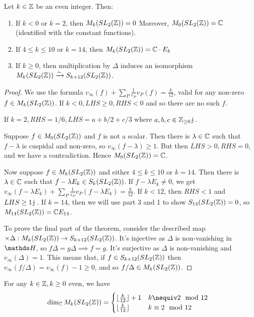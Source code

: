 \documentclass[10pt,a4paper]{article}
\begin{document}
\begin{theorem}
  Let $k \in \mathbb{Z}$ be an even integer. Then:
  \begin{enumerate}
    \item If $k<0$ or $k=2$, then $M_k(SL_2(\mathbb{Z})) = 0$ Moreover, $M_0(SL_2(\mathbb{Z})) = \mathbb{C}$ (identified with the constant functions).
    \item If $4 \leq k \leq 10$ or $k=14$, then $M_k(SL_2(\mathbb{Z})) = \mathbb{C}\cdot E_k$
    \item If $k \geq 0$, then multiplication by $\Delta$ induces an isomorphism $M_k(SL_2(\mathbb{Z})) \xrightarrow{\sim} S_{k+12}(SL_2(\mathbb{Z}))$.
  \end{enumerate}
\end{theorem}
\begin{proof}
  We use the formula $v_\infty(f)+\sum_P \frac{1}{e_P}v_P(f) = \frac{k}{12}$, valid for any non-zero $f \in M_k(SL_2(\mathbb{Z}))$. If $k<0, LHS \geq 0, RHS < 0$ and so there are no such $f$.

  If $k=2, RHS = 1/6, LHS = a+b/2 + c/3$ where $a,b,c \in \mathbb{Z}_{\geq 0}\lightning$.

  Suppose $f \in M_0(SL_2(\mathbb{Z}))$ and $f$ is not a scalar. Then there is $\lambda \in \mathbb{C}$ such that $f-\lambda$ is cuspidal and non-zero, so $v_\infty(f-\lambda) \geq 1$. But then $LHS > 0, RHS = 0$, and we have a contradiction. Hence $M_0(SL_2(\mathbb{Z})) = \mathbb{C}$.

  Now suppose $f \in M_k(SL_2(\mathbb{Z}))$ and either $4 \leq k \leq 10$ or $k=14$. Then there is $\lambda \in \mathbb{C}$ such that $f-\lambda E_k \in S_k(SL_2(\mathbb{Z}))$. If $f-\lambda E_k \neq 0$, we get $v_\infty(f-\lambda E_k) + \sum_P \frac{1}{e_P}v_P(f-\lambda E_k) = \frac{k}{12}$. If $k < 12$, then $RHS < 1$ and $LHS \geq 1 \lightning$. If $k = 14$, then we will use part 3 and 1 to show $S_{14}(SL_2(\mathbb{Z})) = 0$, so $M_{14}(SL_2(\mathbb{Z})) = \mathbb{C} E_{14}$.

  To prove the final part of the theorem, consider the described map $\times \Delta : M_k(SL_2(\mathbb{Z})) \to S_{k+12}(SL_2(\mathbb{Z}))$. It's injective as $\Delta$ is non-vanishing in $\H$, so $f\Delta = g\Delta \implies f = g$. It's surjective as $\Delta$ is non-vanishing and $v_\infty(\Delta) = 1$. This means that, if $f \in S_{k+12}(SL_2(\mathbb{Z}))$ then $v_\infty(f/\Delta) = v_\infty(f)-1 \geq 0$, and so $f/\Delta \in M_k(SL_2(\mathbb{Z}))$.


\end{proof}
\begin{corollary}
  For any $k \in \mathbb{Z}, k \geq 0$ even, we have
  \[\dim_\C M_k(SL_2(\Z)) = \begin{cases} \floor{\frac{k}{12}}+1 & k \nequiv 2 \mod 12\\ \floor{\frac{k}{12}} & k \equiv 2 \mod 12\end{cases}\]
\end{corollary}
\end{document}
